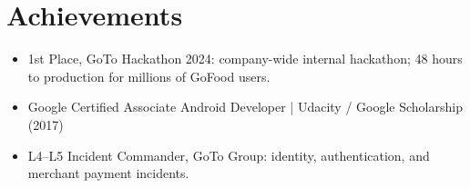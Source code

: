 \documentclass[11pt]{article}
\begin{document}
\section*{Achievements}
\begin{itemize}
\item 1st Place, GoTo Hackathon 2024: company-wide internal hackathon; 48 hours to production for millions of GoFood users.
\item Google Certified Associate Android Developer | Udacity / Google Scholarship (2017)
\item L4–L5 Incident Commander, GoTo Group: identity, authentication, and merchant payment incidents.
\end{itemize}
\end{document}
